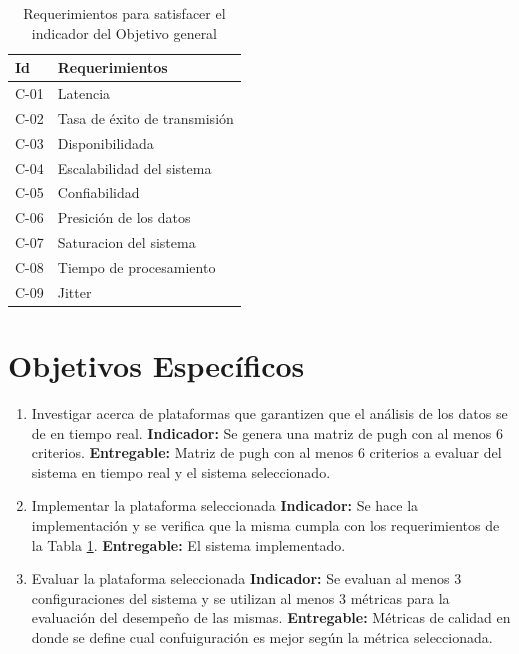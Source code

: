 \documentclass[12pt]{article}
\begin{document}
\begin{table}[!h]
  \centering
    \caption{Requerimientos para satisfacer el indicador del Objetivo general}
    \label{tab:obj_1}
    \begin{tabular}{|l|l|}
    \hline
    Id & Requerimientos \\ \hline
    C-01 & Latencia \\ \hline
    C-02 & Tasa de éxito de transmisión \\ \hline
    C-03 & Disponibilidada \\ \hline
    C-04 & Escalabilidad del sistema \\ \hline
    C-05 & Confiabilidad \\ \hline
    C-06 & Presición de los datos \\ \hline
    C-07 & Saturacion del sistema \\ \hline
    C-08 & Tiempo de procesamiento \\ \hline
    C-09 & Jitter \\ \hline
    \end{tabular}
    \end{table}

\section{Objetivos Específicos}

\begin{enumerate}
    \item Investigar acerca de plataformas que garantizen que el análisis de los datos se de en tiempo real. \newline
    \textbf{Indicador:} Se genera una matriz de pugh con al menos 6 criterios.\newline
    \textbf{Entregable:} Matriz de pugh con al menos 6 criterios a evaluar del sistema en tiempo real y el sistema seleccionado.
    \item Implementar la plataforma seleccionada \newline
    \textbf{Indicador:} Se hace la implementación y se verifica que la misma cumpla con los requerimientos de la Tabla \ref{tab:obj_1}.\newline
    \textbf{Entregable:} El sistema implementado.
    \item Evaluar la plataforma seleccionada \newline
    \textbf{Indicador:} Se evaluan al menos 3 configuraciones del sistema y se utilizan al menos 3 métricas para la evaluación del desempeño de las mismas.\newline
    \textbf{Entregable:} Métricas de calidad en donde se define cual confuiguración es mejor según la métrica seleccionada.
\end{enumerate}
\end{document}

